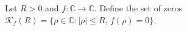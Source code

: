 \begin{definition}[SetOfZeros]
\label{SetOfZeros}
\leanok
Let $R>0$ and $f:\mathbb{C}\to\mathbb{C}$. Define the set of zeros
    $\mathcal{K}_f(R)=\{\rho\in\mathbb{C}:|\rho|\leq R,\,f(\rho)=0\}$.
\end{definition}
